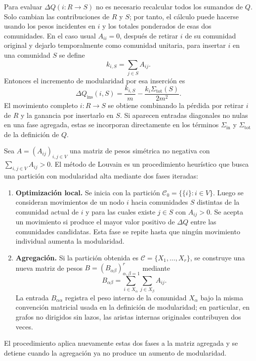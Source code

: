             \begin{observacion}
                Para evaluar $\Delta Q(i:R\to S)$ no es necesario recalcular todos los sumandos de $Q$. Solo cambian las contribuciones de $R$ y $S$; por tanto, el cálculo puede hacerse usando los pesos incidentes en $i$ y los totales ponderados de esas dos comunidades. En el caso usual $A_{ii}=0$, después de retirar $i$ de su comunidad original y dejarlo temporalmente como comunidad unitaria, para insertar $i$ en una comunidad $S$ se define
                \[
                    k_{i,S}=\sum_{j\in S}A_{ij}.
                \]
                Entonces el incremento de modularidad por esa inserción es
                \[
                    \Delta Q_{\mathrm{ins}}(i,S)
                    =
                    \frac{k_{i,S}}{m}
                    -
                    \frac{k_i\Sigma_{\mathrm{tot}}(S)}{2m^2}.
                \]
                El movimiento completo $i:R\to S$ se obtiene combinando la pérdida por retirar $i$ de $R$ y la ganancia por insertarlo en $S$. Si aparecen entradas diagonales no nulas en una fase agregada, estas se incorporan directamente en los términos $\Sigma_{\mathrm{in}}$ y $\Sigma_{\mathrm{tot}}$ de la definición de $Q$.
            \end{observacion}

            \begin{definicion}
                Sea $A=(A_{ij})_{i,j\in V}$ una matriz de pesos simétrica no negativa con $\sum_{i,j\in V}A_{ij}>0$. El método de Louvain es un procedimiento heurístico que busca una partición con modularidad alta mediante dos fases iteradas:

                \begin{enumerate}
                    \item \textbf{Optimización local.} Se inicia con la partición $\mathcal{C}_0=\{\{i\}:i\in V\}$. Luego se consideran movimientos de un nodo $i$ hacia comunidades $S$ distintas de la comunidad actual de $i$ y para las cuales existe $j\in S$ con $A_{ij}>0$. Se acepta un movimiento si produce el mayor valor positivo de $\Delta Q$ entre las comunidades candidatas. Esta fase se repite hasta que ningún movimiento individual aumenta la modularidad.

                    \item \textbf{Agregación.} Si la partición obtenida es $\mathcal{C}=\{X_1,\dots,X_r\}$, se construye una nueva matriz de pesos $B=(B_{\alpha\beta})_{\alpha,\beta=1}^r$ mediante
                    \[
                        B_{\alpha\beta}=\sum_{i\in X_\alpha}\sum_{j\in X_\beta}A_{ij}.
                    \]
                    La entrada $B_{\alpha\alpha}$ registra el peso interno de la comunidad $X_\alpha$ bajo la misma convención matricial usada en la definición de modularidad; en particular, en grafos no dirigidos sin lazos, las aristas internas originales contribuyen dos veces.
                \end{enumerate}

                El procedimiento aplica nuevamente estas dos fases a la matriz agregada y se detiene cuando la agregación ya no produce un aumento de modularidad.
            \end{definicion}

